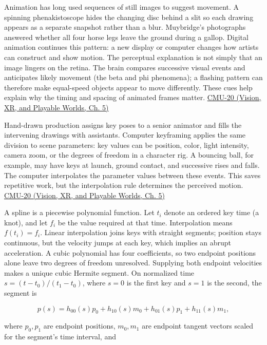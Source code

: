 Animation has long used sequences of still images to suggest movement. A spinning phenakistoscope hides the changing disc behind a slit so each drawing appears as a separate snapshot rather than a blur. Muybridge's photographs answered whether all four horse legs leave the ground during a gallop. Digital animation continues this pattern: a new display or computer changes how artists can construct and show motion. The perceptual explanation is not simply that an image lingers on the retina. The brain compares successive visual events and anticipates likely movement (the beta and phi phenomena); a flashing pattern can therefore make equal-speed objects appear to move differently. These cues help explain why the timing and spacing of animated frames matter. \href{../07-Vision-XR-and-Playable-Worlds/main.pdf\#nameddest=04-visual-computing-ii-ch036-cmu-20---introduction-to-animation}{CMU-20 (Vision, XR, and Playable Worlds, Ch. 5)}

Hand-drawn production assigns key poses to a senior animator and fills the intervening drawings with assistants. Computer keyframing applies the same division to scene parameters: key values can be position, color, light intensity, camera zoom, or the degrees of freedom in a character rig. A bouncing ball, for example, may have keys at launch, ground contact, and successive rises and falls. The computer interpolates the parameter values between these events. This saves repetitive work, but the interpolation rule determines the perceived motion. \href{../07-Vision-XR-and-Playable-Worlds/main.pdf\#nameddest=04-visual-computing-ii-ch036-cmu-20---introduction-to-animation}{CMU-20 (Vision, XR, and Playable Worlds, Ch. 5)}

A spline is a piecewise polynomial function. Let \(t_i\) denote an ordered key time (a knot), and let \(f_i\) be the value required at that time. Interpolation means \(f(t_i)=f_i\). Linear interpolation joins keys with straight segments; position stays continuous, but the velocity jumps at each key, which implies an abrupt acceleration. A cubic polynomial has four coefficients, so two endpoint positions alone leave two degrees of freedom unresolved. Supplying both endpoint velocities makes a unique cubic Hermite segment. On normalized time \(s=(t-t_0)/(t_1-t_0)\), where \(s=0\) is the first key and \(s=1\) is the second, the segment is

\[
p(s)=h_{00}(s)p_0+h_{10}(s)m_0+h_{01}(s)p_1+h_{11}(s)m_1,
\]

where \(p_0,p_1\) are endpoint positions, \(m_0,m_1\) are endpoint tangent vectors scaled for the segment's time interval, and

